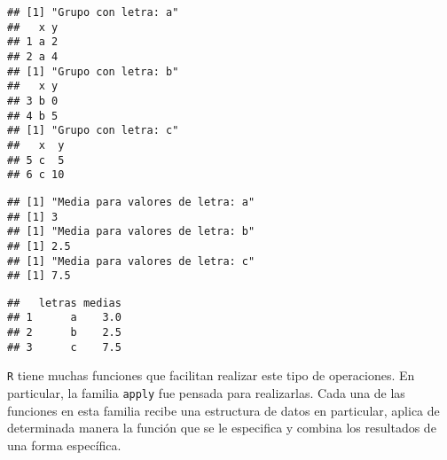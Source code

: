 \documentclass[]{article}
\newenvironment{Shaded}{\begin{snugshade}}{\end{snugshade}}
\newcommand{\KeywordTok}[1]{\textcolor[rgb]{0.13,0.29,0.53}{\textbf{{#1}}}}
\newcommand{\DataTypeTok}[1]{\textcolor[rgb]{0.13,0.29,0.53}{{#1}}}
\newcommand{\StringTok}[1]{\textcolor[rgb]{0.31,0.60,0.02}{{#1}}}
\newcommand{\CommentTok}[1]{\textcolor[rgb]{0.56,0.35,0.01}{\textit{{#1}}}}
\newcommand{\NormalTok}[1]{{#1}}
\begin{document}
\begin{verbatim}
## [1] "Grupo con letra: a"
##   x y
## 1 a 2
## 2 a 4
## [1] "Grupo con letra: b"
##   x y
## 3 b 0
## 4 b 5
## [1] "Grupo con letra: c"
##   x  y
## 5 c  5
## 6 c 10
\end{verbatim}

\begin{Shaded}
\end{Shaded}

\begin{verbatim}
## [1] "Media para valores de letra: a"
## [1] 3
## [1] "Media para valores de letra: b"
## [1] 2.5
## [1] "Media para valores de letra: c"
## [1] 7.5
\end{verbatim}

\begin{Shaded}
\end{Shaded}

\begin{verbatim}
##   letras medias
## 1      a    3.0
## 2      b    2.5
## 3      c    7.5
\end{verbatim}

\texttt{R} tiene muchas funciones que facilitan realizar este tipo de
operaciones. En particular, la familia \texttt{apply} fue pensada para
realizarlas. Cada una de las funciones en esta familia recibe una
estructura de datos en particular, aplica de determinada manera la
función que se le especifica y combina los resultados de una forma
específica.
\end{document}

